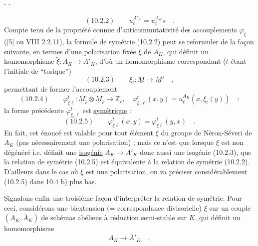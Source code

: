 \begin{center}-  -\end{center}
\[
(10.2.2)\qquad u_\ell^{A'_K}=u_\ell^{A_K}s\quad.
\]
Compte tenu de la propriété connue d'anticommutativité des accouplements $\varphi_\xi$ ([5] ou VIII 2.2.11), la formule de symétrie (10.2.2) peut se reformuler de la façon suivante, en termes d'une polarisation fixée $\xi$ de $A_K$, qui définit un homomorphisme $\widetilde\xi:A_K\longrightarrow A'_K$, d'où un homomorphisme correspondant ($t$ étant l'initiale de ``torique'')
\[
(10.2.3)\qquad\xi_t:\underline M\longrightarrow\underline M'\quad,
\]
permettant de former l'accouplement
\[
(10.2.4)\qquad\varphi_{\xi\ell}^t:\underline M_\ell\otimes\underline M_\ell\longrightarrow\mathbb Z_\ell,\quad
\varphi_{\xi,\ell}^t(x,y)=u_\ell^{A_K}(x,\xi_t(y))\quad:
\]
la forme précédente $\varphi_{\xi,\ell}^t$ est \uline{symétrique} :
\[
(10.2.5)\qquad\varphi_{\xi\ell}^t(x,y)=\varphi_{\xi\ell}^t(y,x)\quad.
\]
En fait, cet énoncé est valable pour tout élément $\xi$ du groupe de Néron-Séveri de $A_K$ (pas nécessairement une polarisation) ; mais ce n'est que lorsque $\xi$ est non dégénéré i.e. définit une \uline{isogénie} $A_K\longrightarrow A'_K$ donc aussi une isogénie (10.2.3), que la relation de symétrie (10.2.5) est équivalente à la relation de symétrie (10.2.2). D'ailleurs dans le cas où $\xi$ est une polarisation, on va préciser considérablement (10.2.5) dans 10.4 b) plus bas.

Signalons enfin une troisième façon d'interpréter la relation de symétrie. Pour ceci, considérons une biextension (= correspondance divisorielle) $\xi$ sur un couple $(A_K,\overline A_K)$ de schémas abéliens à réduction semi-stable sur $K$, qui définit un homomorphisme
\[
A_K\longrightarrow\overline A'_K\quad,
\]
